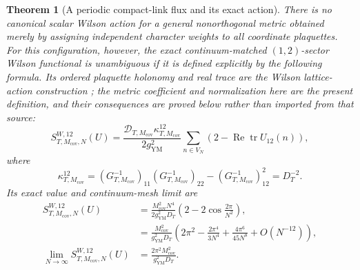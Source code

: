 \documentclass[11pt]{article}
\newtheorem{theorem}{Theorem}[section]
\theoremstyle{definition}
\numberwithin{equation}{section}
\begin{document}
\begin{theorem}[A periodic compact-link flux and its exact action]
There is no canonical scalar Wilson action for a general nonorthogonal
metric obtained merely by assigning independent character weights to all
coordinate plaquettes.  For this configuration, however, the exact
continuum-matched \((1,2)\)-sector Wilson functional is unambiguous if it is
defined explicitly by the following formula.  Its ordered plaquette
holonomy and real trace are the Wilson lattice-action construction
\cite{Wilson_1974}; the metric coefficient and normalization here are the
present definition, and their consequences are proved below rather than
imported from that source:
\begin{equation}
 S^{W,12}_{T,M_{\mathrm{cov}},N}(U)
 =\frac{\mathcal D_{T,M_{\mathrm{cov}}}\kappa^{12}_{T,M_{\mathrm{cov}}}}
        {2g_{\mathrm{YM}}^2}
   \sum_{n\in V_N}
   \left(2-\operatorname{Re}\operatorname{tr}U_{12}(n)\right),
 \label{cusp-link-wilson-sector-definition}
\end{equation}
where
\begin{equation}
 \kappa^{12}_{T,M_{\mathrm{cov}}}
 =(G_{T,M_{\mathrm{cov}}}^{-1})_{11}
  (G_{T,M_{\mathrm{cov}}}^{-1})_{22}
 -(G_{T,M_{\mathrm{cov}}}^{-1})_{12}^2
 =D_T^{-2}.
 \label{cusp-link-two-form-minor}
\end{equation}
Its exact value and continuum-mesh limit are
\begin{align}
 S^{W,12}_{T,M_{\mathrm{cov}},N}(U)
 &=\frac{M_{\mathrm{cov}}^2N^4}{2g_{\mathrm{YM}}^2D_T}
   \left(2-2\cos\frac{2\pi}{N^2}\right),
 \label{cusp-link-wilson-sector-value}\\
 &=\frac{M_{\mathrm{cov}}^2}{g_{\mathrm{YM}}^2D_T}
   \left(
    2\pi^2-\frac{2\pi^4}{3N^4}
    +\frac{4\pi^6}{45N^8}+O(N^{-12})
   \right),
 \label{cusp-link-wilson-sector-expansion}\\
 \lim_{N\to\infty}S^{W,12}_{T,M_{\mathrm{cov}},N}(U)
 &=\frac{2\pi^2M_{\mathrm{cov}}^2}{g_{\mathrm{YM}}^2D_T}.
 \label{cusp-link-wilson-sector-limit}
\end{align}
\end{theorem}
\end{document}
